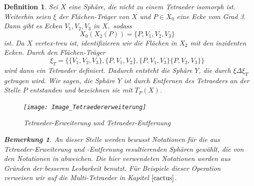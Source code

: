 \documentclass[12pt,titlepage,twoside,cleardoublepage]{article}
\theoremstyle{nummermitklammern}
\newtheorem{definition}[temp]{Definition}
\newtheorem{bemerkung}[temp]{Bemerkung}
\newtheorem{definition}[zahl]{Definition}
\newtheorem{bemerkung}[zahl]{Bemerkung}
\numberwithin{equation}{section}
\begin{document}
\begin{definition}
Sei $X$ eine Sphäre, die nicht zu einem Tetraeder isomorph ist.
Weiterhin seien $\xi$ der Flächen-Träger von $X$ und $P\in X_0$ eine Ecke vom Grad 3. Dann gibt es Ecken $V_1,V_2,V_3$ in $X,$ sodass
\[
X_0(X_2(P))=\{P,V_1,V_2,V_3\}
\] 
ist. Da $X$ vertex-treu ist, identifizieren wir die Flächen in $X_2$  mit den inzidenten Ecken. Durch den Flächen-Träger 
\[
\xi_T=\{\{V_1,V_2,V_3\},\{P,V_1,V_2\},\{P,V_1,V_3\}\{P,V_2,V_3\}\}
\]
 wird dann ein Tetraeder definiert. 
  Dadurch entsteht die Sphäre $Y$, die durch $\xi \Delta \xi_T$ getragen wird. Wir sagen, die Sphäre $Y$ ist durch Entfernen des Tetraeders an der Stelle $P$ entstanden und bezeichnen sie mit $T_P(X)$.
\begin{figure}[H]
\begin{center}
\texttt{[image: Image\_Tetraedererweiterung]}
\end{center}
\caption{Tetraeder-Erweiterung und Tetraeder-Entfernung}
\end{figure}
\begin{bemerkung}
An dieser Stelle werden bewusst Notationen für die aus  Tetraeder-Erweiterung und -Entfernung resultierenden Sphären gewählt, die von den Notationen in \textsc{\cite{simp}} abweichen. Die hier verwendeten Notationen werden aus Gründen der besseren Lesbarkeit benutzt. Für Beispiele dieser Operation verweisen wir auf die Multi-Tetraeder in Kapitel $\ref{cactus}$.
\end{bemerkung}
\end{definition}
\end{document}
